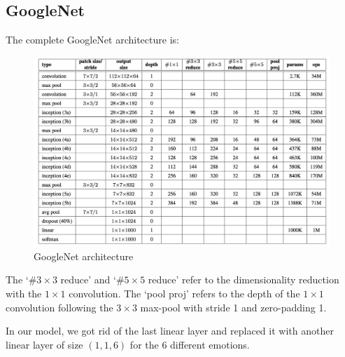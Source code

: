 \subsection{GoogleNet}
The complete GoogleNet architecture is:

\begin{figure}[H]
    \centering
    \includegraphics[width=\textwidth]{Images/googlenet.png}
    \caption{GoogleNet architecture\cite{googlenet}}
\end{figure}

The `\#$3\times3$ reduce' and `\#$5\times5$ reduce' refer to the dimensionality reduction with the $1\times1$ convolution. The `pool proj' refers to the depth of the $1\times1$ convolution following the $3\times3$ max-pool with stride 1 and zero-padding 1.

In our model, we got rid of the last linear layer and replaced it with another linear layer of size $(1, 1, 6)$ for the 6 different emotions.

\newpage
